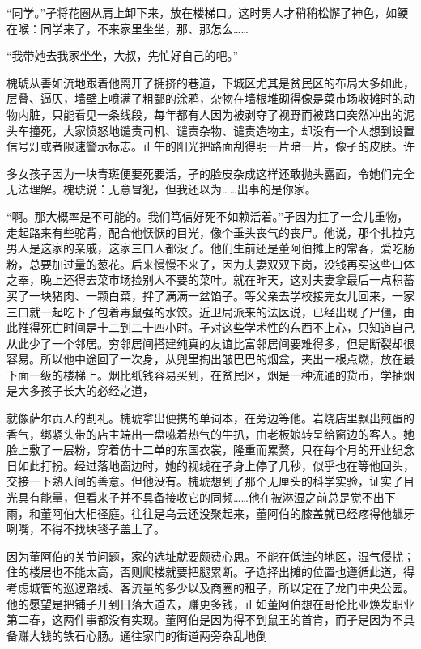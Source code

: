 \documentclass{article}
\begin{document}
“同学。”孑将花圈从肩上卸下来，放在楼梯口。这时男人才稍稍松懈了神色，如鲠在喉：同学来了，不来家里坐坐，那、那怎么……

“我带她去我家坐坐，大叔，先忙好自己的吧。”

槐琥从善如流地跟着他离开了拥挤的巷道，下城区尤其是贫民区的布局大多如此，层叠、逼仄，墙壁上喷满了粗鄙的涂鸦，杂物在墙根堆砌得像是菜市场收摊时的动物内脏，只能看见一条线段，每年都有人因为被剥夺了视野而被路口突然冲出的泥头车撞死，大家愤怒地谴责司机、谴责杂物、谴责造物主，却没有一个人想到设置信号灯或者限速警示标志。正午的阳光把路面刮得明一片暗一片，像孑的皮肤。许

\newpage 

多女孩子因为一块青斑便要死要活，孑的脸皮杂成这样还敢抛头露面，令她们完全无法理解。槐琥说：无意冒犯，但我还以为……出事的是你家。

“啊。那大概率是不可能的。我们笃信好死不如赖活着。”孑因为扛了一会儿重物，走起路来有些驼背，配合他恹恹的目光，像个垂头丧气的丧尸。他说，那个扎拉克男人是这家的亲戚，这家三口人都没了。他们生前还是董阿伯摊上的常客，爱吃肠粉，总要加过量的葱花。后来慢慢不来了，因为夫妻双双下岗，没钱再买这些口体之奉，晚上还得去菜市场捡别人不要的菜叶。就在昨天，这对夫妻拿最后一点积蓄买了一块猪肉、一颗白菜，拌了满满一盆馅子。等父亲去学校接完女儿回来，一家三口就一起吃下了包着毒鼠强的水饺。近卫局派来的法医说，已经出现了尸僵，由此推得死亡时间是十二到二十四小时。孑对这些学术性的东西不上心，只知道自己从此少了一个邻居。穷邻居间搭建纯真的友谊比富邻居间要难得多，但是断裂却很容易。所以他中途回了一次身，从兜里掏出皱巴巴的烟盒，夹出一根点燃，放在最下面一级的楼梯上。烟比纸钱容易买到，在贫民区，烟是一种流通的货币，学抽烟是大多孩子长大的必经之道，

\newpage 

就像萨尔贡人的割礼。槐琥拿出便携的单词本，在旁边等他。岩烧店里飘出煎蛋的香气，绑紧头带的店主端出一盘嗞着热气的牛扒，由老板娘转呈给窗边的客人。她脸上敷了一层粉，穿着仿十二单的东国衣裳，隆重而累赘，只在每个月的开业纪念日如此打扮。经过落地窗边时，她的视线在孑身上停了几秒，似乎也在等他回头，交接一下熟人间的善意。但他没有。槐琥想到了那个无厘头的科学实验，证实了目光具有能量，但看来孑并不具备接收它的同频……他在被淋湿之前总是觉不出下雨，和董阿伯大相径庭。往往是乌云还没聚起来，董阿伯的膝盖就已经疼得他龇牙咧嘴，不得不找块毯子盖上了。

因为董阿伯的关节问题，家的选址就要颇费心思。不能在低洼的地区，湿气侵扰；住的楼层也不能太高，否则爬楼就要把腿累断。孑选择出摊的位置也遵循此道，得考虑城管的巡逻路线、客流量的多少以及商圈的租子，所以定在了龙门中央公园。他的愿望是把铺子开到日落大道去，赚更多钱，正如董阿伯想在哥伦比亚焕发职业第二春，这两件事都没有实现。董阿伯是因为得不到鼠王的首肯，而孑是因为不具备赚大钱的铁石心肠。通往家门的街道两旁杂乱地倒
\end{document}
